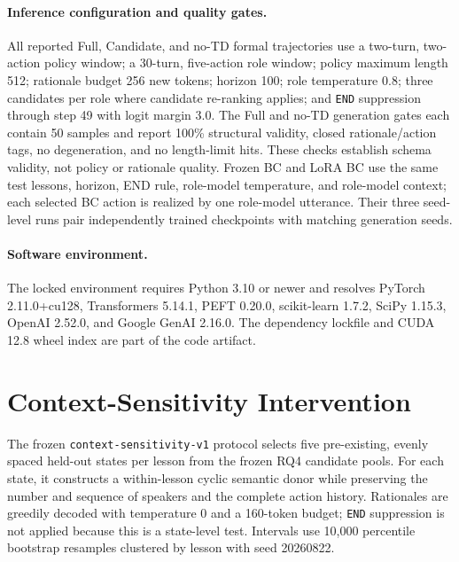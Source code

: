 \documentclass[manuscript,review,anonymous]{acmart}
\begin{document}
\paragraph{Inference configuration and quality gates.}
All reported Full, Candidate, and no-TD formal trajectories use a two-turn,
two-action policy window; a 30-turn, five-action role window; policy maximum
length 512; rationale budget 256 new tokens; horizon 100; role temperature 0.8;
three candidates per role where candidate re-ranking applies; and \texttt{END}
suppression through step 49 with logit margin 3.0. The Full and no-TD
generation gates each contain 50 samples and report 100\% structural validity,
closed rationale/action tags, no degeneration, and no length-limit hits. These
checks establish schema validity, not policy or rationale quality.
Frozen BC and LoRA BC use the same test lessons, horizon, END rule, role-model
temperature, and role-model context; each selected BC action is realized by one
role-model utterance. Their three seed-level runs pair independently trained
checkpoints with matching generation seeds.

\paragraph{Software environment.}
The locked environment requires Python 3.10 or newer and resolves PyTorch
2.11.0+cu128, Transformers 5.14.1, PEFT 0.20.0, scikit-learn 1.7.2, SciPy
1.15.3, OpenAI 2.52.0, and Google GenAI 2.16.0. The dependency lockfile and
CUDA 12.8 wheel index are part of the code artifact.

\section{Context-Sensitivity Intervention}
\label{sec:context-intervention}

The frozen \texttt{context-sensitivity-v1} protocol selects five pre-existing,
evenly spaced held-out states per lesson from the frozen RQ4 candidate pools.
For each state, it constructs a within-lesson cyclic semantic donor while
preserving the number and sequence of speakers and the complete action history.
Rationales are greedily decoded with temperature 0 and a 160-token budget;
\texttt{END} suppression is not applied because this is a state-level test.
Intervals use 10,000 percentile bootstrap resamples clustered by lesson with
seed 20260822.
\end{document}

